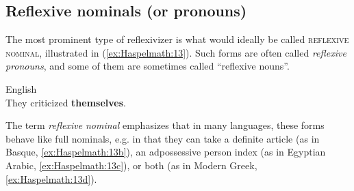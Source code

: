 \documentclass[output=paper]{langscibook}
\begin{document}
\subsection{Reflexive nominals (or pronouns)}\label{sec:Haspelmath:5.1}

The most prominent type of reflexivizer is what would ideally be called \textsc{reflexive} \textsc{nominal}, illustrated in (\ref{ex:Haspelmath:13}). Such forms are often called \textit{reflexive} \textit{pronouns}, and some of them are sometimes called “reflexive nouns”.

\ea \label{ex:Haspelmath:13}
    \ea English\label{ex:Haspelmath:13a}\\ 
   {They} {criticized} \textbf{{themselves}}.
      \z
\z 
   


The term \textit{reflexive} \textit{nominal} emphasizes that in many languages, these forms behave like full nominals, e.g. in that they can take a definite article (as in Basque, \ref{ex:Haspelmath:13b}), an adpossessive person index (as in Egyptian Arabic, \ref{ex:Haspelmath:13c}), or both (as in Modern Greek,  \ref{ex:Haspelmath:13d}).
\end{document}
